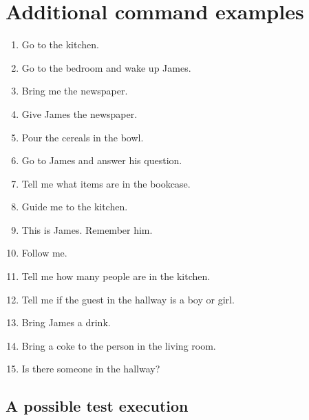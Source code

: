 \section{Additional command examples}
\begin{enumerate}
	\item Go to the kitchen.
	\item Go to the bedroom and wake up James.
	\item Bring me the newspaper.
	\item Give James the newspaper.
	\item Pour the cereals in the bowl.
	\item Go to James and answer his question.
	\item Tell me what items are in the bookcase.
	\item Guide me to the kitchen.
	\item This is James. Remember him.
	\item Follow me.
	\item Tell me how many people are in the kitchen.
	\item Tell me if the guest in the hallway is a boy or girl.
	\item Bring James a drink.
	\item Bring a coke to the person in the living room.
	\item Is there someone in the hallway?
\end{enumerate}

\subsection{A possible test execution}
